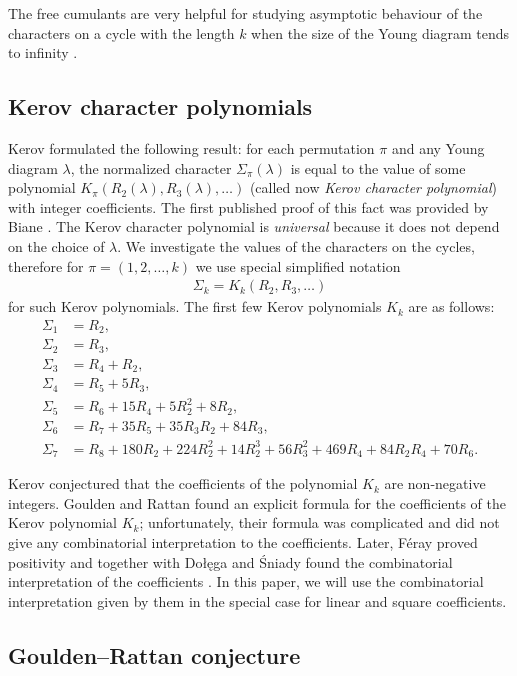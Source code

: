 \documentclass[submission]{FPSAC2021}
\begin{document}
The free cumulants are very helpful for studying
asymptotic behaviour of the characters on a
cycle with the length $k$ when the size of the
Young diagram tends to infinity \cite{Bia98}.

\subsection{Kerov character polynomials}

Kerov formulated the following result: 
for each permutation $\pi$ and any Young
diagram $\lambda$, the normalized 
character $\Sigma_{\pi}(\lambda)$ is 
equal to the value of some polynomial 
$K_{\pi}(R_2(\lambda), R_3(\lambda), \ldots)$
(called now \emph{Kerov character polynomial})
with integer coefficients. The first 
published proof of this fact was provided 
by Biane \cite{Bia03}. The Kerov character
polynomial is \emph{universal} because it 
does not depend on the choice of $\lambda$. 
We investigate the values of the characters 
on the cycles, therefore for 
$\pi=(1, 2, \ldots, k)$ we use 
special simplified notation
\begin{align}
\label{kerpol}
\Sigma_k=K_k(R_2, R_3, \ldots)
\end{align}
for such Kerov polynomials. The first few Kerov polynomials $K_k$ are as follows:
\begin{align*}
\Sigma_1&=R_2,\\
\Sigma_2&=R_3,\\
\Sigma_3&=R_4+R_2,\\
\Sigma_4&=R_5+5R_3,\\
\Sigma_5&=R_6+15R_4+5R_2^2+8R_2,\\
\Sigma_6&=R_7+35R_5+35R_3R_2+84R_3, \\
\Sigma_7&=R_8+180R_2+224R_2^2+14R_2^3+56R_3^2+469R_4+84R_2R_4+70R_6.
\end{align*}

Kerov conjectured that the coefficients of 
the polynomial $K_k$ are non-negative integers.
Goulden and Rattan \cite{GR05} found an explicit 
formula for the coefficients of the Kerov
polynomial $K_k$; unfortunately, their formula 
was complicated and did not give any combinatorial
interpretation to the coefficients. Later, 
F\'{e}ray proved positivity \cite{Fer09} and together 
with Dołęga and Śniady found the combinatorial 
interpretation of the coefficients \cite{DFS10}.
In this paper, we will use the combinatorial
interpretation given by them in the special case 
for linear and square coefficients.


\subsection{Goulden--Rattan conjecture}
\end{document}
